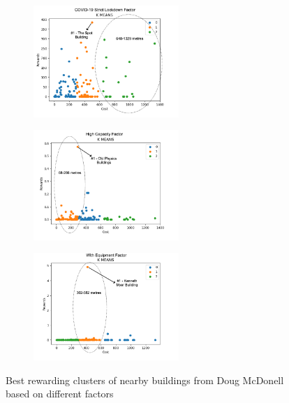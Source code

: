 \begin{itemize}
\begin{figure}[H]
\centering
\begin{subfigure}[b]{0.30\textwidth}
  \centering
  \includegraphics[width=5.5cm,keepaspectratio=true]{resources/images/spatial-mr/doug-mr-results/clusters_reward_covid_19.png}
\end{subfigure}
\begin{subfigure}[b]{0.30\textwidth}
  \centering
  \includegraphics[width=5.5cm,keepaspectratio=true]{resources/images/spatial-mr/doug-mr-results/clusters_reward_high_cap.png}
\end{subfigure}
\begin{subfigure}[b]{0.30\textwidth}
  \centering
  \includegraphics[width=5.5cm,keepaspectratio=true]{resources/images/spatial-mr/doug-mr-results/clusters_reward_with_eqps.png}
\end{subfigure}
\caption{Best rewarding clusters of nearby buildings from Doug McDonell based on different factors}
\label{fig:doug-mr-other-factors}
\end{figure}
    
\end{itemize}


